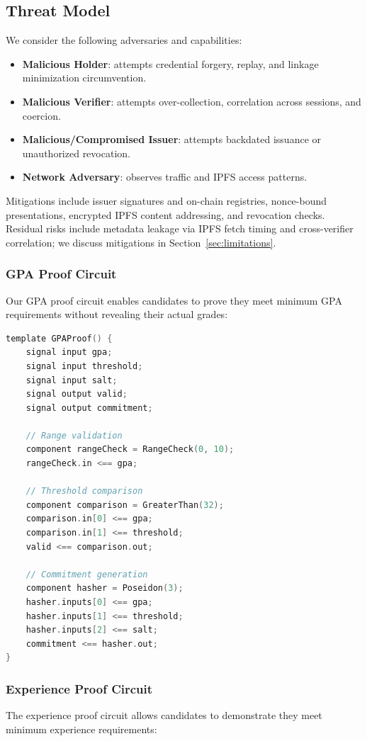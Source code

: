 \documentclass[conference]{IEEEtran}
\begin{document}
\subsection{Threat Model}
We consider the following adversaries and capabilities:
\begin{itemize}
    \item \textbf{Malicious Holder}: attempts credential forgery, replay, and linkage minimization circumvention.
    \item \textbf{Malicious Verifier}: attempts over-collection, correlation across sessions, and coercion.
    \item \textbf{Malicious/Compromised Issuer}: attempts backdated issuance or unauthorized revocation.
    \item \textbf{Network Adversary}: observes traffic and IPFS access patterns.
\end{itemize}
Mitigations include issuer signatures and on-chain registries, nonce-bound presentations, encrypted IPFS content addressing, and revocation checks. Residual risks include metadata leakage via IPFS fetch timing and cross-verifier correlation; we discuss mitigations in Section~\ref{sec:limitations}.

\subsubsection{GPA Proof Circuit}
Our GPA proof circuit enables candidates to prove they meet minimum GPA requirements without revealing their actual grades:

\begin{lstlisting}[language=C, caption=GPA Proof Circuit]
template GPAProof() {
    signal input gpa;
    signal input threshold;
    signal input salt;
    signal output valid;
    signal output commitment;
    
    // Range validation
    component rangeCheck = RangeCheck(0, 10);
    rangeCheck.in <== gpa;
    
    // Threshold comparison
    component comparison = GreaterThan(32);
    comparison.in[0] <== gpa;
    comparison.in[1] <== threshold;
    valid <== comparison.out;
    
    // Commitment generation
    component hasher = Poseidon(3);
    hasher.inputs[0] <== gpa;
    hasher.inputs[1] <== threshold;
    hasher.inputs[2] <== salt;
    commitment <== hasher.out;
}
\end{lstlisting}

\subsubsection{Experience Proof Circuit}
The experience proof circuit allows candidates to demonstrate they meet minimum experience requirements:
\end{document}
